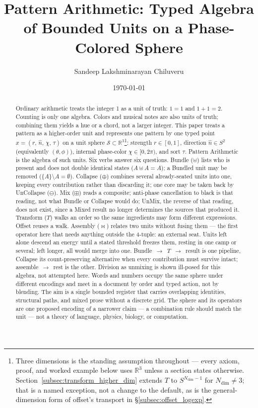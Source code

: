 \documentclass[12pt, a4paper]{article}
\title{Pattern Arithmetic: Typed Algebra of Bounded Units on a Phase-Colored Sphere}
\author{Sandeep Lakshminarayan Chiluveru}
\date{\today}
\begin{document}
\maketitle

\begin{abstract}
Ordinary arithmetic treats the integer 1 as a unit of truth: $1=1$ and $1+1=2$. Counting is only one algebra. Colors and musical notes are also units of truth; combining them yields a hue or a chord, not a larger integer. This paper treats a pattern as a higher-order unit and represents one pattern by one typed point
$x = (r,\,\hat n,\,\chi,\,\tau)$
on a unit sphere $\mathcal{S} \subset \mathbb{R}^3$\footnote{Three
dimensions is the standing assumption throughout --- every axiom,
proof, and worked example below uses $\mathbb{R}^3$ unless a section
states otherwise. Section~\ref{subsec:transform_higher_dim} extends
$T$ to $S^{N_{\mathrm{dim}}-1}$ for $N_{\mathrm{dim}}\ne3$; that is a
named exception, not a change to the default, as is the
general-dimension form of offset's transport in
\S\ref{subsec:offset_logexp}.}:
strength $r \in [0, 1]$,
direction $\hat n \in S^2$ (equivalently $(\theta,\phi)$),
internal phase-color $\chi \in [0, 2\pi)$,
and sort $\tau$.
Pattern Arithmetic is the algebra of such units. Six verbs answer
six questions. Bundle ($\uplus$) lists who is present and does not
double identical states ($A \uplus A = A$); a Bundled unit may be
removed ($\{A\} \setminus A = \emptyset$). Collapse ($\oplus$)
combines several already-seated units into one, keeping every
contribution rather than discarding it; one core may be
taken back by UnCollapse ($\ominus$). Mix ($\boxplus$) reads a
composite; anti-phase cancellation to black is that reading, not
what Bundle or Collapse would do; UnMix, the reverse of that reading, does not
exist, since a Mixed result no longer determines the sources that
produced it. Transform ($T$) walks an order so the same ingredients
may form different expressions. Offset reuses a walk. Assembly
($\bowtie$) relates two units without fusing them --- the first
operator here that needs anything outside the 4-tuple: an external
seat. Units left alone descend an energy until a stated threshold
freezes them, resting in one camp or several; left longer, all would
merge into one. Bundle~$\to$~$T$~$\to$~result is
one pipeline, Collapse its count-preserving alternative when every
contribution must survive intact; assemble~$\to$~rest is the other. Division as
unmixing is shown ill-posed for this algebra, not attempted here. Words and numbers occupy the same sphere under different encodings and meet in a document by order and typed action, not by blending. The aim is a single bounded register that carries overlapping identities, structural paths, and mixed prose without a discrete grid. The sphere and its operators are one proposed encoding of a narrower claim --- a combination rule should match the unit --- not a theory of language, physics, biology, or computation.
\end{abstract}
\end{document}
